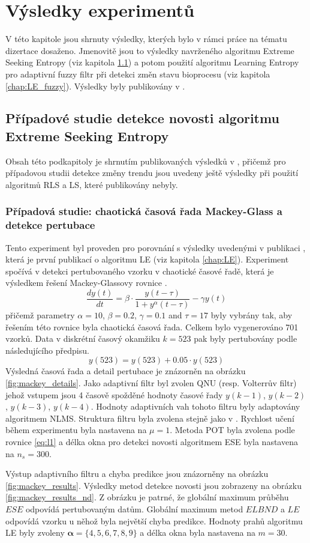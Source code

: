 \chapter{Výsledky experimentů}\label{chap:vysledky}
V této kapitole jsou shrnuty výsledky, kterých bylo v rámci práce na tématu dizertace dosaženo. Jmenovitě jsou to výsledky navrženého algoritmu Extreme Seeking Entropy (viz kapitola \ref{chap: ESE_vysledky}) a potom použití algoritmu Learning Entropy pro adaptivní fuzzy filtr při detekci změn stavu bioprocesu (viz kapitola \ref{chap:LE_fuzzy}). Výsledky byly publikovány v \cite{ese_mdpi}.
\section{Případové studie detekce novosti algoritmu Extreme Seeking Entropy}\label{chap: ESE_vysledky}
Obsah této podkapitoly je shrnutím publikovaných výsledků v \cite{ese_mdpi}, přičemž pro případovou studii detekce změny trendu jsou uvedeny ještě výsledky při použití algoritmů RLS a LS, které publikovány nebyly.
\subsection{Případová studie: chaotická časová řada Mackey-Glass a detekce pertubace}
Tento experiment byl proveden pro porovnání s výsledky uvedenými v publikaci \cite{ivoLE1}, která je první publikací o algoritmu LE (viz kapitola \ref{chap:LE}). Experiment spočívá v detekci pertubovaného vzorku v chaotické časové řadě, která je výsledkem řešení Mackey-Glassovy rovnice \cite{mackey}.
\begin{equation}
    \frac{dy(t)}{dt}= \beta \cdot \frac{ y(t-\tau)}{1 + y^\alpha(t-\tau)} - \gamma y(t)
\end{equation}
přičemž parametry $\alpha = 10$, $\beta = 0.2$, $\gamma = 0.1$ and $\tau = 17$ byly vybrány tak, aby řešením této rovnice byla chaotická časová řada. Celkem bylo vygenerováno 701 vzorků. Data v diskrétní časový okamžiku $k=523$ pak byly pertubovány podle následujícího předpisu.
\begin{equation}
    y(523) = y(523) + 0.05 \cdot y(523)
\end{equation}
Výsledná časová řada a detail pertubace je znázorněn na obrázku \ref{fig:mackey_details}. Jako adaptivní filtr byl zvolen QNU (resp. Volterrův filtr) jehož vstupem jsou 4 časově spožděné hodnoty časové řady $y(k-1)$, $y(k-2)$, $y(k-3)$, $y(k-4)$. Hodnoty adaptivních vah tohoto filtru byly adaptovány algoritmem NLMS. Struktura filtru byla zvolena stejně jako v \cite{ivoLE1}. Rychlost učení během experimentu byla nastavena na $\mu=1$. Metoda POT byla zvolena podle rovnice \ref{eq:l1} a délka okna pro detekci novosti algoritmem ESE byla nastavena na $n_s=300$. 
\par 
Výstup adaptivního filtru a chyba predikce jsou znázorněny na obrázku \ref{fig:mackey_results}. Výsledky metod detekce novosti jsou zobrazeny na obrázku \ref{fig:mackey_results_nd}. Z obrázku je patrné, že globální maximum průběhu $ESE$ odpovídá pertubovaným datům. Globální maximum metod $ELBND$ a $LE$ odpovídá vzorku u něhož byla největší chyba predikce. Hodnoty prahů algoritmu LE byly zvoleny $\boldsymbol{\alpha}=\{4,5,6,7,8,9\}$ a délka okna byla nastavena na $m=30$.


